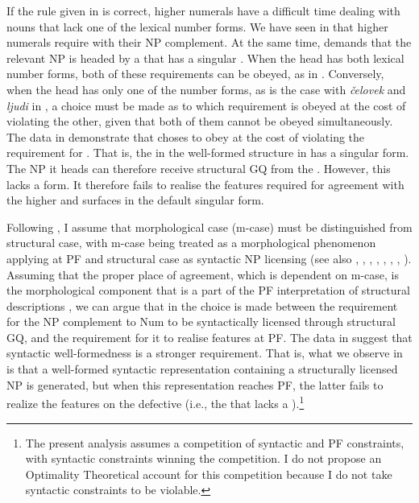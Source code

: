 \documentclass[output=paper,modfonts,newtxmath,hidelinks]{langscibook}
\begin{document}
\noindent If the rule given in  is correct,  higher numerals have a difficult time dealing with nouns that lack one of the lexical number forms. We have seen in  that higher numerals require  with their NP complement. At the same time,  demands that the relevant NP is headed by a  that has a singular . When the head  has both lexical number forms, both of these requirements can be obeyed, as in . Conversely, when the head  has only one of the number forms, as is the case with \textit{čelovek} and \textit{ljudi} in , a choice must be made as to which requirement is obeyed at the cost of violating the other, given that both of them cannot be obeyed simultaneously. The data in  demonstrate that  choses to obey  at the cost of violating the requirement for . That is, the  in the well-formed structure in  has a singular form. The NP it heads can therefore receive structural GQ from the . However, this  lacks a  form. It therefore fails to realise the   features required for agreement with the higher  and surfaces in the default  singular form.

Following \citet{Bobaljik2008}, I assume that morphological case (m-case) must be distinguished from structural case, with m-case being treated as a morphological phenomenon applying at PF and structural case as syntactic NP licensing (see also \citealt{Harley1995}, \citealt{Marantz2000}, \citealt{McFadden2004}, \citealt{Schütze1997}, \citealt{Sigurðsson1991},  \citealt{Sigurðsson2003}, \citealt{Yip-etal1987}, \citealt{Zaenen-etal1985}). Assuming that the proper place of agreement, which is dependent on m-case, is the morphological component that is a part of the PF interpretation of structural descriptions \citep{Bobaljik2008}, we can argue that in  the choice is made between the requirement for the NP complement to Num to be syntactically licensed through structural GQ, and the requirement for it to realise  features at PF. The data in  suggest that syntactic well-formedness is a stronger requirement. That is, what we observe in  is that a well-formed syntactic representation containing a structurally licensed NP is generated, but when this representation reaches PF, the latter fails to realize the   features on the defective  (i.e., the  that lacks a  ).\footnote{\label{18:fn6}The present analysis assumes a competition of syntactic and PF constraints, with syntactic constraints winning the competition. I do not propose an Optimality Theoretical account for this competition because I do not take syntactic constraints to be violable.}
\end{document}
